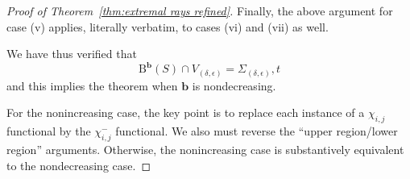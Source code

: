 \documentclass[12pt]{amsart}
\theoremstyle{definition}
\theoremstyle{remark}
\newcommand{\bb}{\mathbf{b}}
\newcommand{\BBQ}{\mathrm{B}}
\begin{document}
\begin{proof}[Proof of Theorem~\ref{thm:extremal rays refined}]
Finally, the above argument for case (v) applies, literally verbatim, to cases (vi) and (vii) as well. 

We have thus verified that
\[
\BBQ^{\bb}(S)\cap V_{(\delta,\epsilon)}=\Sigma_{(\delta,\epsilon)},t
\]
and this implies the theorem when $\bb$ is nondecreasing.  

For the nonincreasing case, the key point is to replace each instance of a $\chi_{i,j}$ functional by the $\chi^{-}_{i,j}$ functional.  We also must reverse the ``upper region/lower region'' arguments.  Otherwise, the nonincreasing case is substantively equivalent to the nondecreasing case.
\end{proof}










\end{document}
